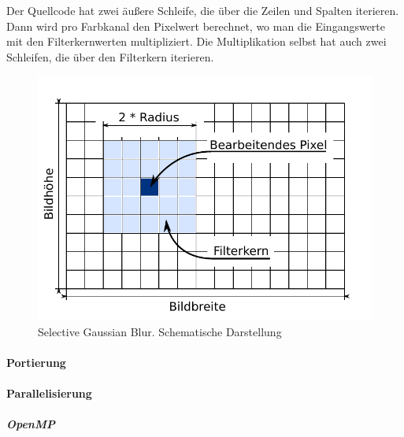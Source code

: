 Der Quellcode hat zwei äußere Schleife, die über die Zeilen und Spalten iterieren. Dann wird pro Farbkanal den Pixelwert berechnet, wo man die Eingangswerte mit den Filterkernwerten multipliziert. Die Multiplikation selbst hat auch zwei Schleifen, die über den Filterkern iterieren.   


\begin{figure}
\centering
\includegraphics[scale=0.9]{sgb-grid.pdf}
\caption{Selective Gaussian Blur. Schematische Darstellung}
\label{fig:sgb-grid}
\end{figure} 
\paragraph{Portierung}
\paragraph{Parallelisierung}
\subparagraph{OpenMP}